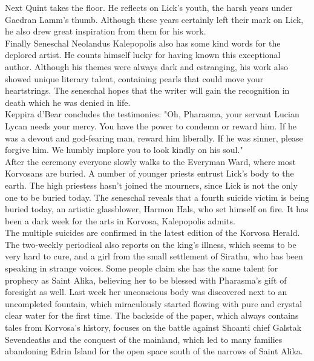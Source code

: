 Next Quint takes the floor. He reflects on Lick's youth, the harsh years under Gaedran Lamm's thumb. Although these years certainly left their mark on Lick, he also drew great inspiration from them for his work.\\

Finally Seneschal Neolandus Kalepopolis also has some kind words for the deplored artist. He counts himself lucky for having known this exceptional author. Although his themes were always dark and estranging, his work also showed unique literary talent, containing pearls that could move your heartstrings. The seneschal hopes that the writer will gain the recognition in death which he was denied in life.\\

Keppira d'Bear concludes the testimonies: "Oh, Pharasma, your servant Lucian Lycan needs your mercy. You have the power to condemn or reward him. If he was a devout and god-fearing man, reward him liberally. If he was sinner, please forgive him. We humbly implore you to look kindly on his soul."\\

After the ceremony everyone slowly walks to the Everyman Ward, where most Korvosans are buried. A number of younger priests entrust Lick's body to the earth. The high priestess hasn't joined the mourners, since Lick is not the only one to be buried today. The seneschal reveals that a fourth suicide victim is being buried today, an artistic glassblower, Harmon Hals, who set himself on fire. It has been a dark week for the arts in Korvosa, Kalepopolis admits.\\

The multiple suicides are confirmed in the latest edition of the Korvosa Herald. The two-weekly periodical also reports on the king's illness, which seems to be very hard to cure, and a girl from the small settlement of Sirathu, who has been speaking in strange voices. Some people claim she has the same talent for prophecy as Saint Alika, believing her to be blessed with Pharasma's gift of foresight as well. Last week her unconscious body was discovered next to an uncompleted fountain, which miraculously started flowing with pure and crystal clear water for the first time. The backside of the paper, which always contains tales from Korvosa's history, focuses on the battle against Shoanti chief Galstak Sevendeaths and the conquest of the mainland, which led to many families abandoning Edrin Island for the open space south of the narrows of Saint Alika.\\

